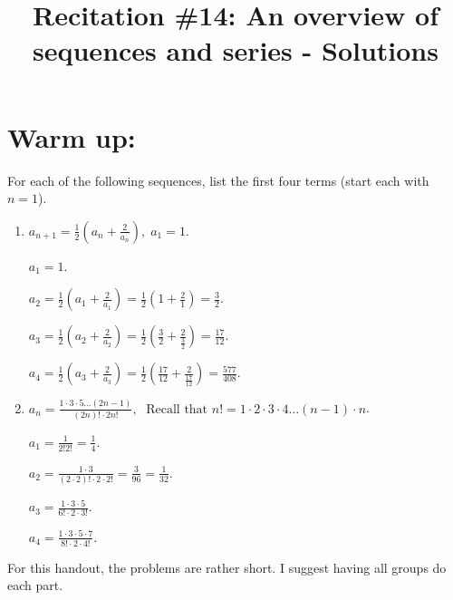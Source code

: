 \documentclass[noinstructornotes]{ximera}
\title{Recitation \#14: An overview of sequences and series - Solutions}
\begin{document}
\begin{abstract}		\end{abstract}
\maketitle




\section{Warm up:}

	For each of the following sequences, list the first four terms (start each with $n=1$).
	\begin{enumerate}
	\item 	$a_{n+1} = \frac{1}{2} \left( a_n + \frac{2}{a_n} \right), \; a_1 = 1$.
	\begin{freeResponse}
	  \; $a_1 = 1$.
	
	  \; $a_2 = \frac{1}{2} \left( a_1 + \frac{2}{a_1} \right) = \frac{1}{2} \left( 1 + \frac{2}{1} \right) = \frac{3}{2}$.
	
	  \; $a_3 = \frac{1}{2} \left( a_2 + \frac{2}{a_2} \right) = \frac{1}{2} \left( \frac{3}{2} + \frac{2}{\frac{3}{2}} \right) = \frac{17}{12}$.
	
	  \; $a_4 = \frac{1}{2} \left( a_3 + \frac{2}{a_3} \right) = \frac{1}{2} \left( \frac{17}{12} + \frac{2}{\frac{17}{12}} \right) = \frac{577}{408}.$
	\end{freeResponse}
	
	
	
	\item 	$a_n = \frac{1 \cdot 3 \cdot 5 \hdots (2n-1)}{(2n)! \cdot 2n!}, \; \text{ Recall that }n! = 1 \cdot 2 \cdot 3 \cdot 4 \hdots (n-1) \cdot n$.
	\begin{freeResponse}
	  \; $a_1 = \frac{1}{2! 2!} = \frac{1}{4}$.
	
	  \; $a_2 = \frac{1 \cdot 3}{(2 \cdot 2)! \cdot 2 \cdot 2!} = \frac{3}{96} = \frac{1}{32}$.
	
	  \; $a_3 = \frac{1 \cdot 3 \cdot 5}{6! \cdot 2 \cdot 3!}$.
	
	  \; $a_4 = \frac{1 \cdot 3 \cdot 5 \cdot 7}{8! \cdot 2 \cdot 4!}$.
	\end{freeResponse}
	\end{enumerate}
	
\begin{instructorNotes}
For this handout, the problems are rather short. I suggest having all groups do each part.
\end{instructorNotes}
\end{document}
